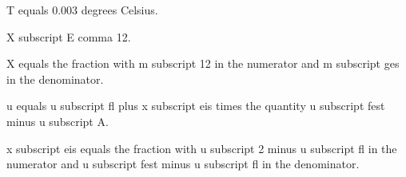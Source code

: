 T equals 0.003 degrees Celsius.

X subscript E comma 12.

X equals the fraction with m subscript 12 in the numerator and m subscript ges in the denominator.

u equals u subscript fl plus x subscript eis times the quantity u subscript fest minus u subscript A.

x subscript eis equals the fraction with u subscript 2 minus u subscript fl in the numerator and u subscript fest minus u subscript fl in the denominator.